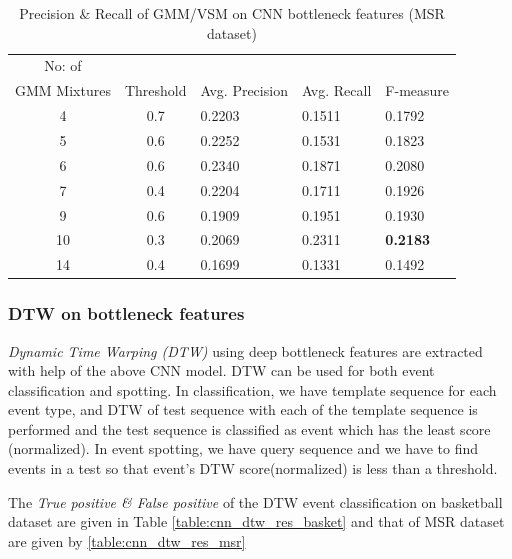 \begin{table}[h]
\caption[Event spotting using GMM/VSM on CNN (on pre-processed input) bottleneck features (MSR Action Dataset) ]{ Precision \& Recall  of GMM/VSM on CNN bottleneck features (MSR dataset)}
\label{table:cnn_gmm_res_msr}
\centering
\begin{tabular}{|c|c|l|l|l|}
\hline
No: of &&&&\\
GMM Mixtures & Threshold & Avg. Precision & Avg. Recall & F-measure\\
\hline
\hline
 4 	&0.7 	&0.2203 	& 0.1511	&0.1792\\
 5 	&0.6 	&0.2252 	& 0.1531	&0.1823\\
 6 	&0.6 	&0.2340 	& 0.1871	&0.2080\\
 7 	&0.4 	&0.2204 	& 0.1711	&0.1926\\
 9 	&0.6 	&0.1909 	& 0.1951	&0.1930\\
10 	&0.3 	&0.2069 	& 0.2311	&\textbf{0.2183}\\
14 	&0.4 	&0.1699 	& 0.1331	&0.1492\\
\hline  
\end{tabular}
\end{table} 


\subsubsection{DTW on bottleneck features}
\textit{Dynamic Time Warping (DTW)} using deep bottleneck features are extracted with help of the above CNN model.  DTW can be used for both event classification and spotting.  In classification, we have template sequence for each event type, and DTW of test sequence with each of the template sequence is performed and the test sequence is classified as event which has the least score (normalized).  In event spotting, we have query sequence and we have to find events in a test so that event's DTW score(normalized) is less than a threshold.


The \textit{True positive \& False positive} of the DTW event classification on basketball dataset are given in Table \ref{table:cnn_dtw_res_basket} and that of MSR dataset are given by \ref{table:cnn_dtw_res_msr}

